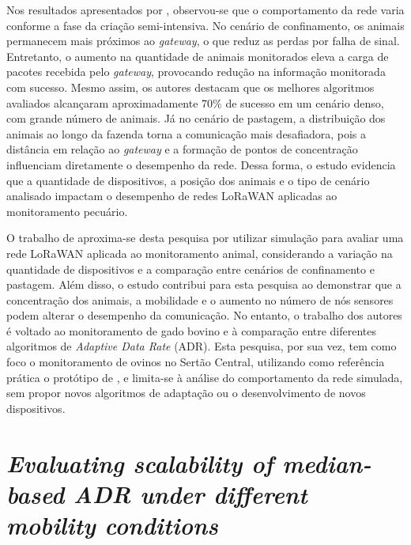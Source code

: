 Nos resultados apresentados por , observou-se que o comportamento da rede varia conforme a fase da criação semi-intensiva. No cenário de confinamento, os animais permanecem mais próximos ao \textit{gateway}, o que reduz as perdas por falha de sinal. Entretanto, o aumento na quantidade de animais monitorados eleva a carga de pacotes recebida pelo \textit{gateway}, provocando redução na informação monitorada com sucesso. Mesmo assim, os autores destacam que os melhores algoritmos avaliados alcançaram aproximadamente 70\% de sucesso em um cenário denso, com grande número de animais. Já no cenário de pastagem, a distribuição dos animais ao longo da fazenda torna a comunicação mais desafiadora, pois a distância em relação ao \textit{gateway} e a formação de pontos de concentração influenciam diretamente o desempenho da rede. Dessa forma, o estudo evidencia que a quantidade de dispositivos, a posição dos animais e o tipo de cenário analisado impactam o desempenho de redes LoRaWAN aplicadas ao monitoramento pecuário.

O trabalho de  aproxima-se desta pesquisa por utilizar simulação para avaliar uma rede LoRaWAN aplicada ao monitoramento animal, considerando a variação na quantidade de dispositivos e a comparação entre cenários de confinamento e pastagem. Além disso, o estudo contribui para esta pesquisa ao demonstrar que a concentração dos animais, a mobilidade e o aumento no número de nós sensores podem alterar o desempenho da comunicação. No entanto, o trabalho dos autores é voltado ao monitoramento de gado bovino e à comparação entre diferentes algoritmos de \textit{Adaptive Data Rate} (ADR). Esta pesquisa, por sua vez, tem como foco o monitoramento de ovinos no Sertão Central, utilizando como referência prática o protótipo de , e limita-se à análise do comportamento da rede simulada, sem propor novos algoritmos de adaptação ou o desenvolvimento de novos dispositivos.


\section{\textit{Evaluating scalability of median-based ADR under different mobility conditions}}
\label{sec:tr-sarmentoneto2025}

